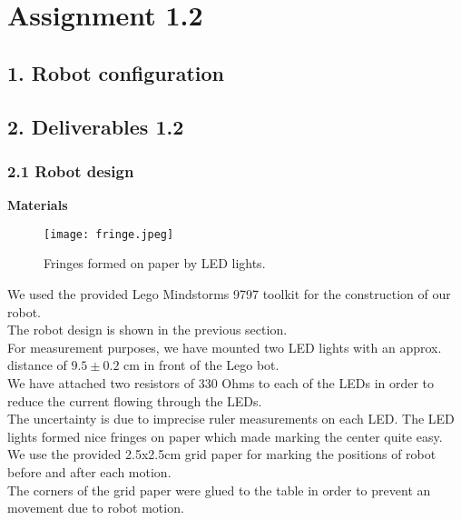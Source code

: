 \section*{Assignment 1.2}
\subsection*{1. Robot configuration}
\label{robot-config}
\subsection*{2. Deliverables 1.2}
\subsubsection*{2.1 Robot design}
\textbf{Materials}
\begin{wrapfigure}{r}{0.4\textwidth}
  \vspace{-50pt}
  \begin{center}
    \texttt{[image: fringe.jpeg]}
  \end{center}
  \vspace{-20pt}
  \caption{Fringes formed on paper by LED lights.}
\end{wrapfigure}

We used the provided Lego Mindstorms 9797 toolkit for the construction of our robot.\\
The robot design is shown in the previous section.\\
For measurement purposes, we have mounted two LED lights with an approx. distance of $9.5 \pm 0.2$ cm in front of the Lego bot. \\
We have attached two resistors of 330 Ohms to each of the LEDs in order to reduce the current flowing through the LEDs. \\
The uncertainty is due to imprecise ruler measurements on each LED. The LED lights formed nice fringes on paper which made marking the center quite easy.\\
We use the provided  2.5x2.5cm grid paper for marking the positions of robot before and after each motion.\\
The corners of the grid paper were glued to the table in order to prevent an movement due to robot motion. 

